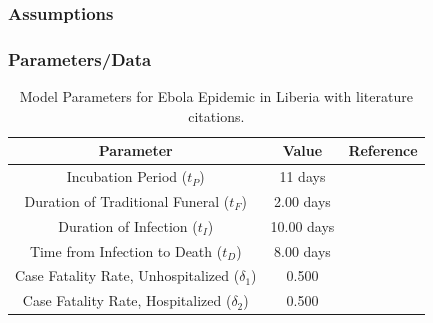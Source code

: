 \documentclass[30pt]{beamer}
\begin{document}
\begin{frame}
\frametitle{Assumptions}
\end{frame}

\begin{frame}
\frametitle{Parameters/Data}
\begin{table}[ht]
\centering %
\begin{tabular}{c c c}
\hline\hline %
Parameter & Value  & Reference \\ [0.5ex]
\hline %
Incubation Period (${t_{P}}$) & 11 days & \cite{WHOFacts} \\
Duration of Traditional Funeral (${t_{F}}$) & 2.00 days & \cite{Rivers2014} \\
Duration of Infection (${t_{I}}$) & 10.00 days & \cite{Rivers2014} \\
Time from Infection to Death (${t_{D}}$) & 8.00 days & \cite{Rivers2014} \\
Case Fatality Rate, Unhospitalized ($\delta_{1}$) & 0.500 & \cite{WHOFacts} \\
Case Fatality Rate, Hospitalized ($\delta_{2}$) & 0.500 & \cite{WHOFacts} \\ [1ex]
\hline
\end{tabular}
\label{tab:knownParameters}
\caption{Model Parameters for Ebola Epidemic in Liberia with literature citations.} %
\end{table}
\end{frame}
\end{document}
